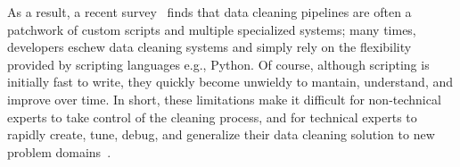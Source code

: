 As a result, a recent survey~\cite{krishnan2016hilda} finds that data cleaning pipelines are often a patchwork of custom scripts and multiple specialized systems; many times, developers eschew data cleaning systems and simply rely on the flexibility provided by scripting languages e.g., Python.  Of course, although scripting is initially fast to write, they quickly become unwieldy to mantain, understand, and improve over time.  
In short, these limitations make it difficult for non-technical experts to take control of the cleaning process, and for technical experts to rapidly create, tune, debug, and generalize their data cleaning solution to new problem domains~\cite{sculley2014machine,krishnan2016hilda}.







